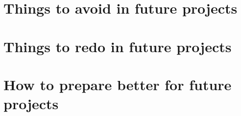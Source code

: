 \section{Things to avoid in future projects}

\section{Things to redo in future projects}

\section{How to prepare better for future projects}
